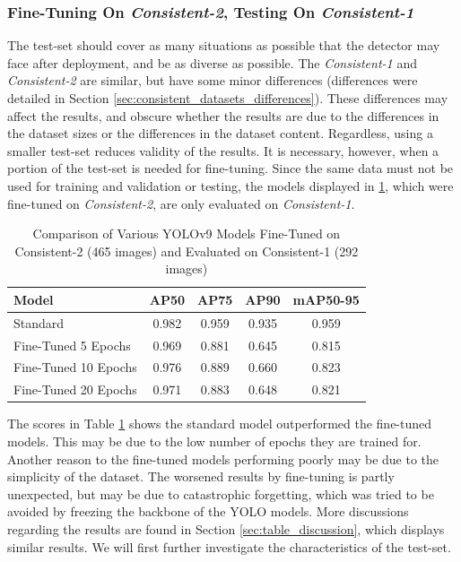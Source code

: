 \subsubsection{Fine-Tuning On \textit{Consistent-2}, Testing On \textit{Consistent-1}}
The test-set should cover as many situations as possible that the detector may face after deployment, and be as diverse as possible. The \textit{Consistent-1} and \textit{Consistent-2} are similar, but have some minor differences (differences were detailed in Section \ref{sec:consistent_datasets_differences}). These differences may affect the results, and obscure whether the results are due to the differences in the dataset sizes or the differences in the dataset content. Regardless, using a smaller test-set reduces validity of the results. It is necessary, however, when a portion of the test-set is needed for fine-tuning. Since the same data must not be used for training and validation or testing, the models displayed in \ref{tab:APs_fine_tuning}, which were fine-tuned on \textit{Consistent-2}, are only evaluated on \textit{Consistent-1}.

\begin{table}[H]
    \centering
    \renewcommand{\arraystretch}{1.5} %
    \setlength{\tabcolsep}{1em}
    \begin{tabular}{|l|c|c|c|c|}
        \hline
        \rowcolor{gray!25}
        \textbf{Model} & \textbf{AP50} & \textbf{AP75} & \textbf{AP90} & \textbf{mAP50-95} \\ \hline
        Standard             & 0.982 & 0.959 & 0.935 & 0.959 \\ \hline 
        Fine-Tuned 5 Epochs  & 0.969 & 0.881 & 0.645 & 0.815 \\ \hline
        Fine-Tuned 10 Epochs & 0.976 & 0.889 & 0.660 & 0.823 \\ \hline
        Fine-Tuned 20 Epochs & 0.971 & 0.883 & 0.648 & 0.821 \\ \hline
    \end{tabular}
    \caption{Comparison of Various YOLOv9 Models Fine-Tuned on Consistent-2 (465 images) and Evaluated on Consistent-1 (292 images)}
    \label{tab:APs_fine_tuning}
\end{table}

The scores in Table \ref{tab:APs_fine_tuning} shows the standard model outperformed the fine-tuned models. This may be due to the low number of epochs they are trained for. Another reason to the fine-tuned models performing poorly may be due to the simplicity of the dataset. The worsened results by fine-tuning is partly unexpected, but may be due to catastrophic forgetting, which was tried to be avoided by freezing the backbone of the YOLO models. More discussions regarding the results are found in Section \ref{sec:table_discussion}, which displays similar results. We will first further investigate the characteristics of the test-set.

